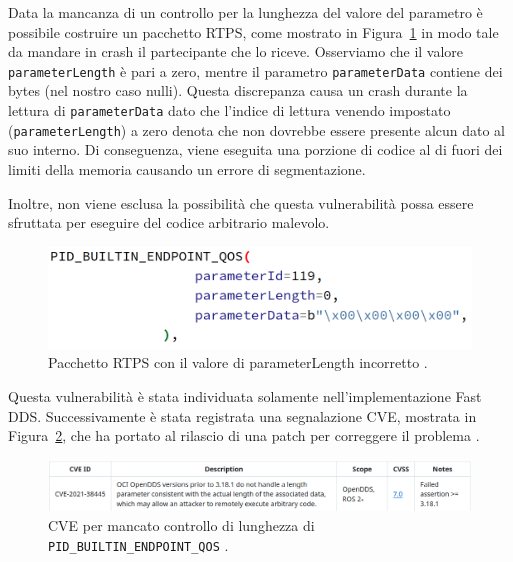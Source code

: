 Data la mancanza di un controllo per la lunghezza del 
valore del parametro è possibile costruire un pacchetto 
RTPS, come mostrato in Figura~\ref{crashnode} 
in modo tale da 
mandare in crash il partecipante che lo riceve. 
Osserviamo che il valore \texttt{parameterLength} è pari a zero,
mentre il parametro \texttt{parameterData} contiene dei bytes 
(nel nostro caso nulli).
Questa discrepanza causa un crash durante la 
lettura di \texttt{parameterData} dato che l'indice di lettura 
venendo impostato (\texttt{parameterLength}) a zero 
denota che non dovrebbe essere 
presente alcun dato al suo interno. 
Di conseguenza,
viene eseguita una porzione di codice al di fuori dei 
limiti della memoria causando un errore di segmentazione.

Inoltre, 
non viene esclusa la possibilità che questa vulnerabilità 
possa essere sfruttata per eseguire del codice arbitrario 
malevolo.

\begin{figure}[H]
    \centering
    \includegraphics[width=15.2cm, keepaspectratio]{img/crashnode.png}
    \caption{Pacchetto RTPS con il valore di parameterLength incorretto 
    \cite{mayoral2022robot}.}
    \label{crashnode}
\end{figure}


Questa vulnerabilità è stata individuata solamente 
nell'implementazione Fast DDS.
Successivamente 
è stata registrata una segnalazione CVE, mostrata in 
Figura~\ref{CVEnodecrashing},
che ha portato 
al rilascio di una patch per correggere il problema \cite{mayoral2022robot}.


\begin{figure}[H]
    \centering
    \includegraphics[width=15.2cm, keepaspectratio]{img/CVE node crashing.png}
    \caption{CVE per mancato controllo di lunghezza 
    di \texttt{PID\_BUILTIN\_ENDPOINT\_QOS} \cite{mayoral2022robot}.}
    \label{CVEnodecrashing}
\end{figure}
